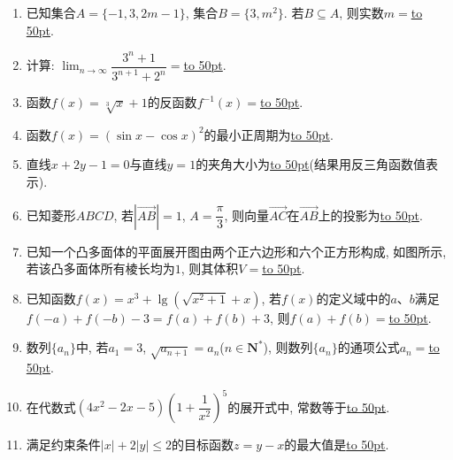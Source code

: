 \documentclass[10pt,a4paper]{article}
\newcommand{\blank}[1]{\underline{\hbox to #1pt{}}}
\begin{document}
\begin{enumerate}[1.]
\item 已知集合$A=\{-1,3,2m-1\}$, 集合$B=\{3,m^2\}$. 若$B\subseteq A$, 则实数$m=$\blank{50}.  
\item 计算: $\displaystyle\lim_{n\to\infty}\dfrac{3^n+1}{3^{n+1}+2^n}=$\blank{50}.  
\item 函数$f(x)=\sqrt[3]x+1$的反函数$f^{-1}(x)=$\blank{50}.  
\item 函数$f(x)=(\sin x-\cos x)^2$的最小正周期为\blank{50}.  
\item 直线$x+2y-1=0$与直线$y=1$的夹角大小为\blank{50}(结果用反三角函数值表示).
\item 已知菱形$ABCD$, 若$|\overrightarrow{AB}|=1$, $A=\dfrac\pi 3$, 则向量$\overrightarrow{AC}$在$\overrightarrow{AB}$上的投影为\blank{50}.  
\item 已知一个凸多面体的平面展开图由两个正六边形和六个正方形构成, 如图所示, 若该凸多面体所有棱长均为$1$, 则其体积$V=$\blank{50}.
\begin{center}
\end{center}
\item 已知函数$f(x)={x^3}+\lg (\sqrt{x^2+1}+x)$, 若$f(x)$的定义域中的$a$、$b$满足$f(-a)+f(-b)-3=f(a)+f(b)+3$, 则$f(a)+f(b)=$\blank{50}.  
\item 数列$\{a_n\}$中, 若$a_1=3$, $\sqrt{a_{n+1}}=a_n$($n\in \mathbf{N}^*$), 则数列$\{a_n\}$的通项公式$a_n=$\blank{50}.
\item 在代数式$(4x^2-2x-5)(1+\dfrac1{x^2})^5$的展开式中, 常数等于\blank{50}.  
\item 满足约束条件$|x|+2|y|\le 2 $的目标函数$z=y-x$的最大值是\blank{50}.



\end{enumerate}
\end{document}

